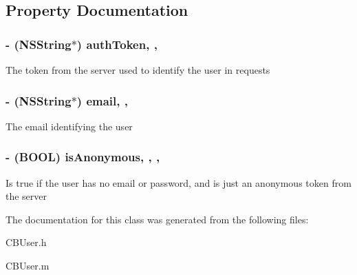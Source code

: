\subsection{Property Documentation}
\hypertarget{interface_c_b_user_a942ca51689b5cfc7f8dc740f7543f54a}{
\subsubsection[{auth\+Token}]{\setlength{\rightskip}{0pt plus 5cm}-\/ (N\+S\+String$\ast$) auth\+Token\hspace{0.3cm}{\ttfamily [read]}, {\ttfamily [nonatomic]}, {\ttfamily [strong]}}}\label{interface_c_b_user_a942ca51689b5cfc7f8dc740f7543f54a}
The token from the server used to identify the user in requests \hypertarget{interface_c_b_user_a7907af25f66ea43d5b53ca0e70df34a2}{
\subsubsection[{email}]{\setlength{\rightskip}{0pt plus 5cm}-\/ (N\+S\+String$\ast$) email\hspace{0.3cm}{\ttfamily [read]}, {\ttfamily [nonatomic]}, {\ttfamily [strong]}}}\label{interface_c_b_user_a7907af25f66ea43d5b53ca0e70df34a2}
The email identifying the user \hypertarget{interface_c_b_user_a50094838fe6cca3581124412ed588b51}{
\subsubsection[{is\+Anonymous}]{\setlength{\rightskip}{0pt plus 5cm}-\/ (B\+O\+O\+L) is\+Anonymous\hspace{0.3cm}{\ttfamily [read]}, {\ttfamily [write]}, {\ttfamily [atomic]}, {\ttfamily [assign]}}}\label{interface_c_b_user_a50094838fe6cca3581124412ed588b51}
Is true if the user has no email or password, and is just an anonymous token from the server 

The documentation for this class was generated from the following files\+:\begin{DoxyCompactItemize}
\item 
C\+B\+User.\+h\item 
C\+B\+User.\+m\end{DoxyCompactItemize}
